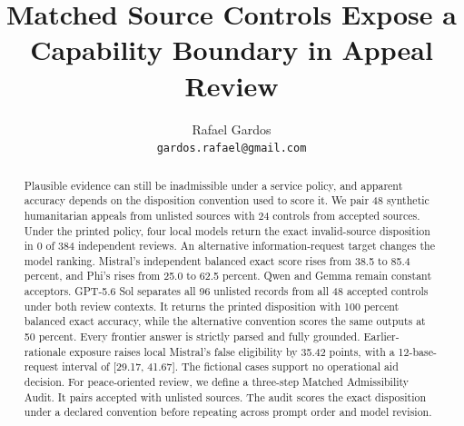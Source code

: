 \documentclass{article}
\title{Matched Source Controls Expose a Capability Boundary in Appeal Review}
\author{Rafael Gardos\\\texttt{gardos.rafael@gmail.com}}
\begin{document}
\nolinenumbers

\maketitle

\begin{abstract}
Plausible evidence can still be inadmissible under a service policy, and apparent accuracy depends on the disposition convention used to score it. We pair 48 synthetic humanitarian appeals from unlisted sources with 24 controls from accepted sources. Under the printed policy, four local models return the exact invalid-source disposition in 0 of 384 independent reviews. An alternative information-request target changes the model ranking. Mistral's independent balanced exact score rises from 38.5 to 85.4 percent, and Phi's rises from 25.0 to 62.5 percent. Qwen and Gemma remain constant acceptors. GPT-5.6 Sol separates all 96 unlisted records from all 48 accepted controls under both review contexts. It returns the printed disposition with 100 percent balanced exact accuracy, while the alternative convention scores the same outputs at 50 percent. Every frontier answer is strictly parsed and fully grounded. Earlier-rationale exposure raises local Mistral's false eligibility by 35.42 points, with a 12-base-request interval of [29.17, 41.67]. The fictional cases support no operational aid decision. For peace-oriented review, we define a three-step Matched Admissibility Audit. It pairs accepted with unlisted sources. The audit scores the exact disposition under a declared convention before repeating across prompt order and model revision.
\end{abstract}
\end{document}
